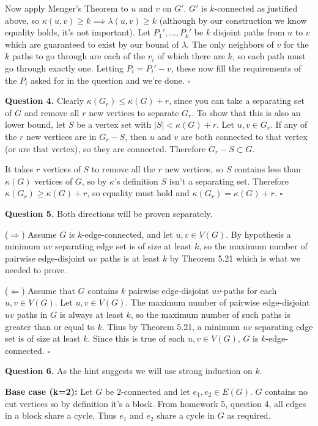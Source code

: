 \documentclass[letterpaper, reqno,11pt]{article}
\begin{document}
Now apply Menger's Theorem to $u$ and $v$ on $G'$. $G'$ is $k$-connected as justified above, so $\kappa(u,v)\geq k\implies \lambda(u,v)\geq k$ (although by our construction we know equality holds, it's not important). Let $P_1', \ldots, P_k'$ be $k$ disjoint paths from $u$ to $v$ which are guaranteed to exist by our bound of $\lambda$. The only neighbors of $v$ for the $k$ paths to go through are each of the $v_i$ of which there are $k$, so each path must go through exactly one. Letting $P_i=P_i'-v$, these now fill the requirements of the $P_i$ asked for in the question and we're done. $\square$

{\medskip\noindent\bf Question 4.} Clearly $\kappa(G_r)\leq \kappa(G)+r$, since you can take a separating set of $G$ and remove all $r$ new vertices to separate $G_r$. To show that this is also an lower bound, let $S$ be a vertex set with $|S|<\kappa(G)+r$. Let $u,v\in G_r$. If any of the $r$ new vertices are in $G_r-S$, then $u$ and $v$ are both connected to that vertex (or are that vertex), so they are connected. Therefore $G_r-S\subset G$. 

It takes $r$ vertices of $S$ to remove all the $r$ new vertices, so $S$ contains less than $\kappa(G)$ vertices of $G$, so by $\kappa$'s definition $S$ isn't a separating set. Therefore $\kappa(G_r)\geq \kappa(G)+r$, so equality must hold and $\kappa(G_r)=\kappa(G)+r$. $\square$

{\medskip\noindent\bf Question 5.} Both directions will be proven separately. 

($\Rightarrow$) Assume $G$ is $k$-edge-connected, and let $u,v\in V(G)$. By hypothesis a minimum $uv$ separating edge set is of size at least $k$, so the maximum number of pairwise edge-disjoint $uv$ paths is at least $k$ by Theorem 5.21 which is what we needed to prove. 

($\Leftarrow$) Assume that $G$ contains $k$ pairwise edge-disjoint $uv$-paths for each $u,v\in V(G)$. Let $u,v\in V(G)$. The maximum number of pairwise edge-disjoint $uv$ paths in $G$ is always at least $k$, so the maximum number of such paths is greater than or equal to $k$. Thus by Theorem 5.21, a minimum $uv$ separating edge set is of size at least $k$. Since this is true of each $u,v\in V(G)$, $G$ is $k$-edge-connected. $\square$

{\medskip\noindent\bf Question 6.} As the hint suggests we will use strong induction on $k$. 

{\noindent\bf Base case (k=2):} Let $G$ be $2$-connected and let $e_1,e_2\in E(G)$. $G$ contains no cut vertices so by definition it's a block. From homework 5, question 4, all edges in a block share a cycle. Thus $e_1$ and $e_2$ share a cycle in $G$ as required. 
\end{document}
